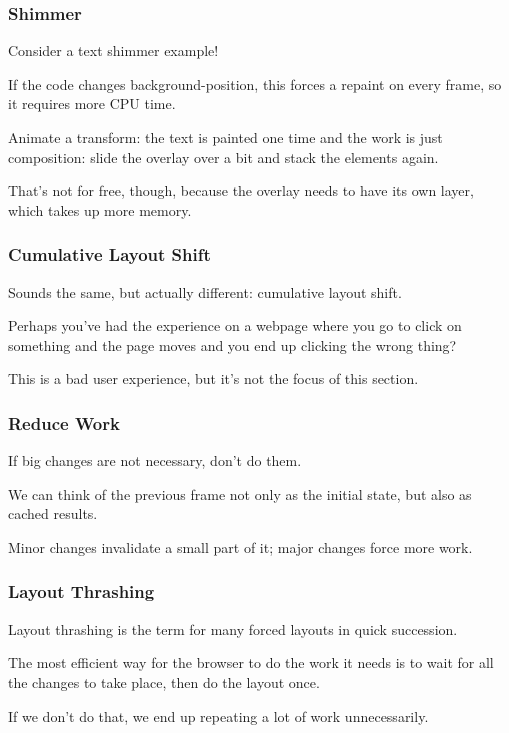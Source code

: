 \begin{frame}
\frametitle{Shimmer}

Consider a text shimmer example!

If the code changes background-position, this forces a repaint on every frame, so it requires more CPU time. 

Animate a transform: the text is painted one time and the work is just composition: slide the overlay over a bit and stack the elements again. 

That's not for free, though, because the overlay needs to have its own layer, which takes up more memory.

\end{frame}


\begin{frame}
\frametitle{Cumulative Layout Shift}

Sounds the same, but actually different: \alert{cumulative layout shift}. 

Perhaps you've had the experience on a webpage where you go to click on something and the page moves and you end up clicking the wrong thing? 

This is a bad user experience, but it's not the focus of this section.

\end{frame}


\begin{frame}
\frametitle{Reduce Work}

If big changes are not necessary, don't do them.

We can think of the previous frame not only as the initial state, but also as cached results.

Minor changes invalidate a small part of it; major changes force more work.

\end{frame}


\begin{frame}
\frametitle{Layout Thrashing}

\alert{Layout thrashing} is the term for many forced layouts in quick succession. 

The most efficient way for the browser to do the work it needs is to wait for all the changes to take place, then do the layout once. 

If we don't do that, we end up repeating a lot of work unnecessarily.


\end{frame}


